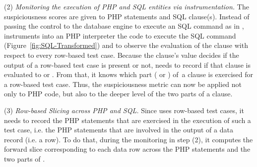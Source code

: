(2) {\em Monitoring the execution of PHP and SQL entities via
instrumentation.} The suspiciousness scores are given to PHP
statements and SQL  clause(s). Instead of passing the
control to the database engine to execute an SQL command as in 
\cite{ga-ase11}, {\tool} instruments into an PHP interpreter the code
to execute the SQL command (Figure~\ref{fig:SQL-Transformed}) and to
observe the evaluation of the  clause with respect to
every row-based test case.  Because the  clause's value
decides if the output of a row-based test case is present or not,
{\tool} needs to record if that clause is evaluated to  or
. From that, it knows which part ( or
) of~a  clause is exercised for a row-based
test case. Thus, the suspiciousness metric can now be applied not only
to PHP code, but also to the deeper level of the two parts of a
 clause.

(3) {\em Row-based Slicing across PHP and SQL.} Since {\tool} uses
row-based test cases, it needs to record the PHP statements that are
exercised in the execution of such a test case, i.e. the PHP
statements that are involved in the output of a data record (i.e. a
row). To do that, during the monitoring in step (2), it computes the
forward slice corresponding to each data row across the PHP statements
and the two parts of .








